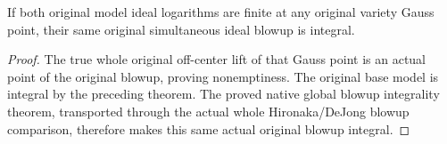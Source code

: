 \begin{theorem}
\label{thm:actual-original-pl-simultaneous-blowup-integral}
\leanok
{}
If both original model ideal logarithms are finite at any original variety
Gauss point, their same original simultaneous ideal blowup is integral.
\end{theorem}
\begin{proof}
The true whole original off-center lift of that Gauss point is an actual
point of the original blowup, proving nonemptiness. The original base model
is integral by the preceding theorem. The proved native global blowup
integrality theorem, transported through the actual whole Hironaka/DeJong
blowup comparison, therefore makes this same actual original blowup integral.
\end{proof}
